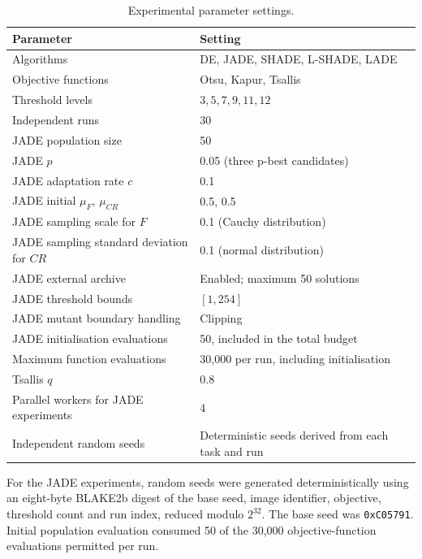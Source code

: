 \documentclass[review]{elsarticle}
\begin{document}
\begin{table}[H]
\caption{Experimental parameter settings.}
\label{tab:parameters}
\centering

\begin{tabular}{ll}
\toprule
\textbf{Parameter} & \textbf{Setting} \\
\midrule

Algorithms &
DE, JADE, SHADE, L-SHADE, LADE \\

Objective functions &
Otsu, Kapur, Tsallis \\

Threshold levels &
$3,5,7,9,11,12$ \\

Independent runs &
30 \\

JADE population size &
50 \\

JADE $p$ &
0.05 (three p-best candidates) \\

JADE adaptation rate $c$ &
0.1 \\

JADE initial $\mu_F$, $\mu_{CR}$ &
0.5, 0.5 \\

JADE sampling scale for $F$ &
0.1 (Cauchy distribution) \\

JADE sampling standard deviation for $CR$ &
0.1 (normal distribution) \\

JADE external archive &
Enabled; maximum 50 solutions \\

JADE threshold bounds &
$[1,254]$ \\

JADE mutant boundary handling &
Clipping \\

JADE initialisation evaluations &
50, included in the total budget \\

Maximum function evaluations &
30,000 per run, including initialisation \\

Tsallis $q$ &
0.8 \\

Parallel workers for JADE experiments &
4 \\

Independent random seeds &
Deterministic seeds derived from each task and run \\

\bottomrule
\end{tabular}

For the JADE experiments, random seeds were generated
deterministically using an eight-byte BLAKE2b digest of
the base seed, image identifier, objective, threshold count
and run index, reduced modulo $2^{32}$. The base seed was
\texttt{0xC05791}. Initial population evaluation consumed
50 of the 30,000 objective-function evaluations permitted
per run.

\end{table}
\end{document}
